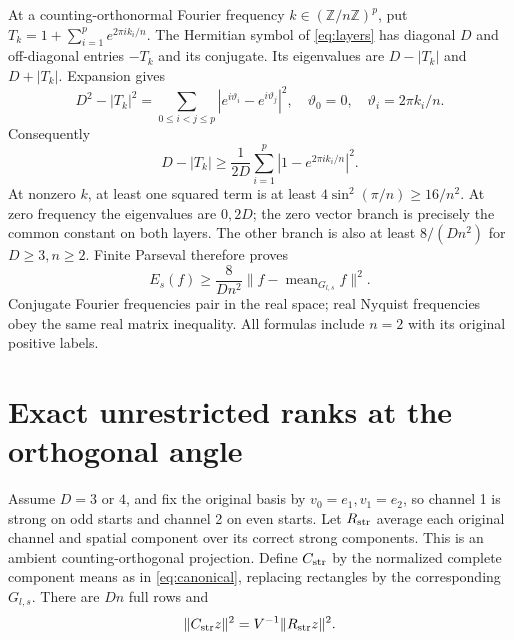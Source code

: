 \documentclass[11pt,a4paper]{article}
\newcommand{\Z}{\mathbb Z}
\newcommand{\norm}[1]{\lVert#1\rVert}
\begin{document}
At a counting-orthonormal Fourier frequency $k\in(\Z/n\Z)^p$, put
$T_k=1+\sum_{i=1}^p e^{2\pi i k_i/n}$. The Hermitian symbol of
\eqref{eq:layers} has diagonal $D$ and off-diagonal entries $-T_k$ and its
conjugate. Its eigenvalues are $D-|T_k|$ and $D+|T_k|$. Expansion gives
\begin{equation}\label{eq:spectrum}
 D^2-|T_k|^2=\sum_{0\leq i<j\leq p}|e^{i\vartheta_i}-e^{i\vartheta_j}|^2,
 \quad \vartheta_0=0,\quad\vartheta_i=2\pi k_i/n.
\end{equation}
Consequently
\begin{equation}\label{eq:gap-symbol}
 D-|T_k|\geq\frac1{2D}\sum_{i=1}^p|1-e^{2\pi i k_i/n}|^2.
\end{equation}
At nonzero $k$, at least one squared term is at least
$4\sin^2(\pi/n)\geq16/n^2$. At zero frequency the eigenvalues are $0,2D$;
the zero vector branch is precisely the common constant on both layers.
The other branch is also at least $8/(Dn^2)$ for $D\geq3,n\geq2$.
Finite Parseval therefore proves
\begin{equation}\label{eq:mean-gap}
 E_s(f)\geq\frac8{Dn^2}\norm{f-\operatorname{mean}_{G_{l,s}}f}^2.
\end{equation}
Conjugate Fourier frequencies pair in the real space; real Nyquist
frequencies obey the same real matrix inequality. All formulas include $n=2$
with its original positive labels.

\section{Exact unrestricted ranks at the orthogonal angle}
Assume $D=3$ or $4$, and fix the original basis by
$v_0=e_1,v_1=e_2$, so channel 1 is strong on odd starts and channel 2 on even
starts. Let $R_{\rm str}$ average each original channel and spatial component
over its correct strong components. This is an ambient counting-orthogonal
projection. Define $C_{\rm str}$ by the normalized complete component means
as in \eqref{eq:canonical}, replacing rectangles by the corresponding
$G_{l,s}$. There are $Dn$ full rows and
\[
 \norm{C_{\rm str}z}^2=V^{-1}\norm{R_{\rm str}z}^2.
\]
\end{document}
